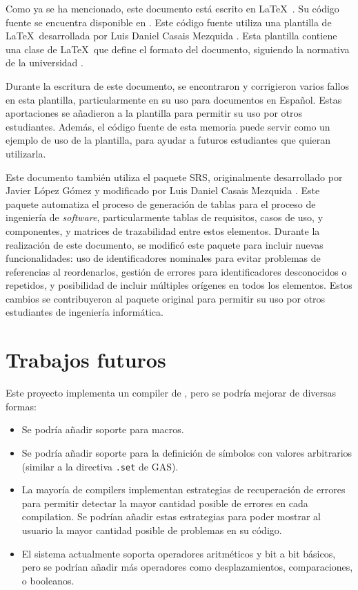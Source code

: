 Como ya se ha mencionado, este documento está escrito en
\LaTeX~\parencite{latex}. Su código fuente se encuentra disponible en
\myreportrepo. Este código fuente utiliza una plantilla de \LaTeX~desarrollada
por Luis Daniel Casais Mezquida \parencite{UC3Mtemplate}. Esta plantilla
contiene una clase de \LaTeX~que define el formato del documento, siguiendo la
normativa de la universidad \parencite{report-guidelines}.

Durante la escritura de este documento, se encontraron y corrigieron varios
fallos en esta plantilla, particularmente en su uso para documentos en Español.
Estas aportaciones se añadieron a la plantilla para permitir su uso por otros
estudiantes. Además, el código fuente de esta memoria puede servir como un
ejemplo de uso de la plantilla, para ayudar a futuros estudiantes que quieran
utilizarla.

Este documento también utiliza el paquete SRS, originalmente desarrollado por
Javier López Gómez y modificado por Luis Daniel Casais Mezquida
\parencite{srs-package}. Este paquete automatiza el proceso de generación de
tablas para el proceso de ingeniería de \textit{software}, particularmente
tablas de requisitos, casos de uso, y componentes, y matrices de trazabilidad
entre estos elementos. Durante la realización de este documento, se modificó
este paquete para incluir nuevas funcionalidades: uso de identificadores
nominales para evitar problemas de referencias al reordenarlos, gestión de
errores para identificadores desconocidos o repetidos, y posibilidad de incluir
múltiples orígenes en todos los elementos. Estos cambios se contribuyeron al
paquete original para permitir su uso por otros estudiantes de ingeniería
informática.

\section{Trabajos futuros}\label{sec:future-work}

Este proyecto implementa un \gls{compiler} de ,
pero se podría mejorar de diversas formas:

\begin{itemize}
    \item Se podría añadir soporte para \glspl{macro}.
    \item Se podría añadir soporte para la definición de símbolos con valores
    arbitrarios (similar a la directiva \verb!.set! de GAS).
    \item La mayoría de \glspl{compiler} implementan estrategias de recuperación
    de errores para permitir detectar la mayor cantidad posible de errores en
    cada \gls{compilation}. Se podrían añadir estas estrategias para poder
    mostrar al usuario la mayor cantidad posible de problemas en su código.
    \item El sistema actualmente soporta operadores aritméticos y bit a bit
    básicos, pero se podrían añadir más operadores como desplazamientos,
    comparaciones, o booleanos.
\end{itemize}

